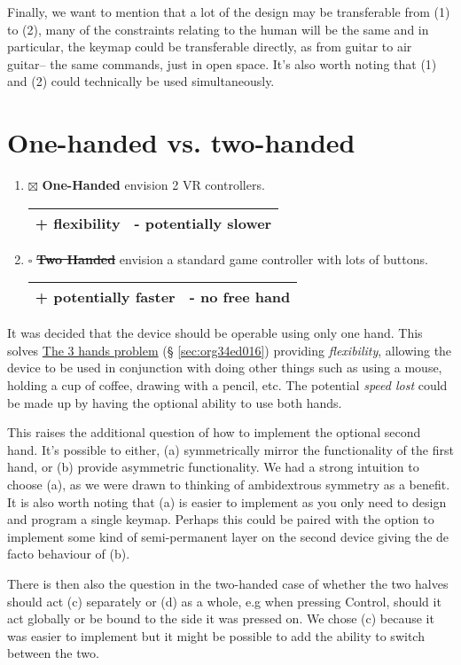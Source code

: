 \documentclass[logo,bsc,singlespacing,parskip]{infthesis}
\begin{document}
Finally, we want to mention that a lot of the design may be transferable from (1) to (2), many of the constraints relating to the human will be the same and in particular, the keymap could be transferable directly, as from guitar to air guitar-- the same commands, just in open space.
It's also worth noting that (1) and (2) could technically be used simultaneously.
\section{One-handed vs. two-handed}
\label{sec:orgce29028}
\begin{enumerate}
\item{$\boxtimes$} \textbf{One-Handed} envision 2 VR controllers.
\begin{longtable}{|p{6.25cm}|p{6.25cm}|}
\hline
+ flexibility & - potentially slower\\
\hline
\end{longtable}
\item{$\square$} \sout{\textbf{Two Handed}} envision a standard game controller with lots of buttons.
\begin{longtable}{|p{6.25cm}|p{6.25cm}|}
\hline
+ potentially faster & - no free hand\\
\hline
\end{longtable}
\end{enumerate}

It was decided that the device should be operable using only one hand.
This solves \hyperref[sec:org34ed016]{The 3 hands problem} (§ \ref{sec:org34ed016}) providing \emph{flexibility}, allowing the device to be used in conjunction with doing other things such as using a mouse, holding a cup of coffee, drawing with a pencil, etc.
The potential \emph{speed lost} could be made up by having the optional ability to use both hands.

This raises the additional question of how to implement the optional second hand.
It's possible to either, (a) symmetrically mirror the functionality of the first hand, or (b) provide asymmetric functionality.
We had a strong intuition to choose (a), as we were drawn to thinking of ambidextrous symmetry as a benefit.
It is also worth noting that (a) is easier to implement as you only need to design and program a single keymap.
Perhaps this could be paired with the option to implement some kind of semi-permanent layer on the second device giving the de facto behaviour of (b).

There is then also the question in the two-handed case of whether the two halves should act (c) separately or (d) as a whole, e.g when pressing Control, should it act globally or be bound to the side it was pressed on.
We chose (c) because it was easier to implement but it might be possible to add the ability to switch between the two.
\end{document}
